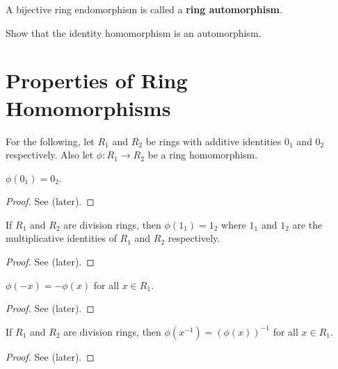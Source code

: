 \begin{definition}
    A bijective ring endomorphism is called a \textbf{ring automorphism}.
\end{definition}

\begin{exercise}\label{exercise-identity-homomorphism-is-an-isomorphism}
    Show that the identity homomorphism is an automorphism.
\end{exercise}

\section{Properties of Ring Homomorphisms}
For the following, let $R_1$ and $R_2$ be rings with additive identities $0_1$ and $0_2$ respectively. Also let $\phi: R_1 \to R_2$ be a ring homomorphism.

\begin{proposition}\label{prop-ring-image-of-additive-identity-is-additive-identity}
    $\phi(0_1) = 0_2$.
\end{proposition}
\begin{proof}
    See  (later).
\end{proof}

\begin{proposition}
    If $R_1$ and $R_2$ are division rings, then $\phi(1_1) = 1_2$ where $1_1$ and $1_2$ are the multiplicative identities of $R_1$ and $R_2$ respectively.
\end{proposition}
\begin{proof}
    See  (later).
\end{proof}

\begin{proposition}
    $\phi(-x) = -\phi(x)$ for all $x \in R_1$.
\end{proposition}
\begin{proof}
    See  (later).
\end{proof}

\begin{proposition}\label{prop-inverse-under-ring-homomorphism}
    If $R_1$ and $R_2$ are division rings, then $\phi(x^{-1}) = (\phi(x))^{-1}$ for all $x \in R_1$.
\end{proposition}
\begin{proof}
    See  (later).
\end{proof}

